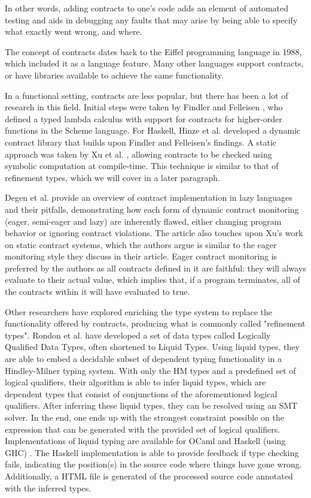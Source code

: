 \documentclass[10pt]{report}
\begin{document}
In other words, adding contracts to one's code adds an element of automated testing and aids in debugging any faults that may arise by being able to specify what exactly went wrong, and where.

The concept of contracts dates back to the Eiffel programming language \cite{Meyer:1988wp} in 1988, which included it as a language feature.
Many other languages support contracts, or have libraries available to achieve the same functionality.

In a functional setting, contracts are less popular, but there has been a lot of research in this field.
Initial steps were taken by Findler and Felleisen \cite{Findler:2002:CHF:583852.581484}, who defined a typed lambda calculus with support for contracts for higher-order functions in the Scheme language.
For Haskell, Hinze et al. \cite{Hinze06typedcontracts} developed a dynamic contract library that builds upon Findler and Felleisen's findings. 
A static approach was taken by Xu et al. \cite{Xu:2006ul, Xu:2009:SCC:1594834.1480889}, allowing contracts to be checked using symbolic computation at compile-time. This technique is similar to that of refinement types, which we will cover in a later paragraph.

Degen et al. \cite{DegenThiemannWehr2009} provide an overview of contract implementation in lazy languages and their pitfalls, demonstrating how each form of dynamic contract monitoring (eager, semi-eager and lazy) are inherently flawed, either changing program behavior or ignoring contract violations.
The article also touches upon Xu's work on static contract systems, which the authors argue is similar to the eager monitoring style they discuss in their article.
Eager contract monitoring is preferred by the authors as all contracts defined in it are faithful: they will always evaluate to their actual value, which implies that, if a program terminates, all of the contracts within it will have evaluated to true.

Other researchers have explored enriching the type system to replace the functionality offered by contracts, producing what is commonly called "refinement types".
Rondon et al. \cite{rondon2008liquid} have developed a set of data types called Logically Qualified Data Types, often shortened to Liquid Types.
Using liquid types, they are able to embed a decidable subset of dependent typing functionality in a Hindley-Milner typing system.
With only the HM types and a predefined set of logical qualifiers, their algorithm is able to infer liquid types, which are dependent types that consist of conjunctions of the aforementioned logical qualifiers.
After inferring these liquid types, they can be resolved using an SMT solver.
In the end, one ends up with the strongest constraint possible on the expression that can be generated with the provided set of logical qualifiers.
Implementations of liquid typing are available for OCaml \cite{rondon2008liquid} and Haskell (using GHC) \cite{rondon2013refinement}.
The Haskell implementation is able to provide feedback if type checking fails, indicating the position(s) in the source code where things have gone wrong.
Additionally, a HTML file is generated of the processed source code annotated with the inferred types.
\end{document}
